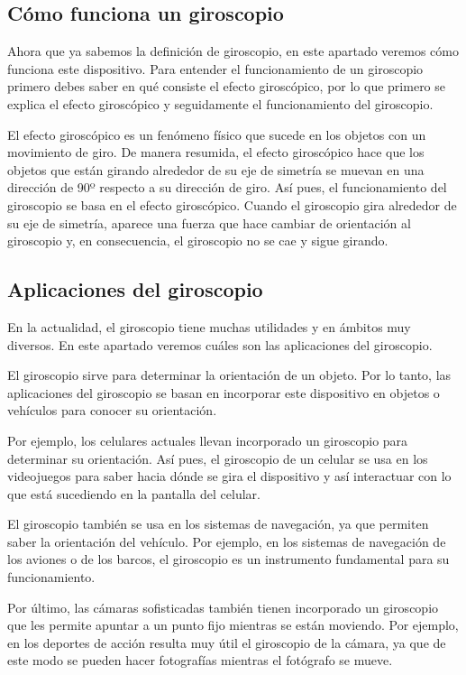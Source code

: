\subsection{ Cómo funciona un giroscopio}

Ahora que ya sabemos la definición de giroscopio, en este apartado veremos cómo funciona este dispositivo. Para entender el funcionamiento de un giroscopio primero debes saber en qué consiste el efecto giroscópico, por lo que primero se explica el efecto giroscópico y seguidamente el funcionamiento del giroscopio.

El efecto giroscópico es un fenómeno físico que sucede en los objetos con un movimiento de giro. De manera resumida, el efecto giroscópico hace que los objetos que están girando alrededor de su eje de simetría se muevan en una dirección de 90º respecto a su dirección de giro.
Así pues, el funcionamiento del giroscopio se basa en el efecto giroscópico. Cuando el giroscopio gira alrededor de su eje de simetría, aparece una fuerza que hace cambiar de orientación al giroscopio y, en consecuencia, el giroscopio no se cae y sigue girando.


\subsection{ Aplicaciones del giroscopio}

En la actualidad, el giroscopio tiene muchas utilidades y en ámbitos muy diversos. En este apartado veremos cuáles son las aplicaciones del giroscopio.

El giroscopio sirve para determinar la orientación de un objeto. Por lo tanto, las aplicaciones del giroscopio se basan en incorporar este dispositivo en objetos o vehículos para conocer su orientación.

Por ejemplo, los celulares actuales llevan incorporado un giroscopio para determinar su orientación. Así pues, el giroscopio de un celular se usa en los videojuegos para saber hacia dónde se gira el dispositivo y así interactuar con lo que está sucediendo en la pantalla del celular.

El giroscopio también se usa en los sistemas de navegación, ya que permiten saber la orientación del vehículo. Por ejemplo, en los sistemas de navegación de los aviones o de los barcos, el giroscopio es un instrumento fundamental para su funcionamiento.

Por último, las cámaras sofisticadas también tienen incorporado un giroscopio que les permite apuntar a un punto fijo mientras se están moviendo. Por ejemplo, en los deportes de acción resulta muy útil el giroscopio de la cámara, ya que de este modo se pueden hacer fotografías mientras el fotógrafo se mueve.


